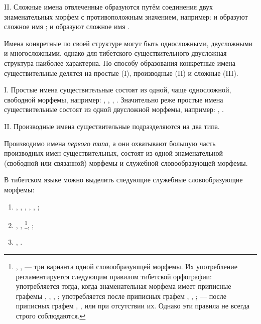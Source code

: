 II. Сложные имена отвлеченные образуются путём соединения двух знаменательных морфем с противоположным значением, например:  и  образуют сложное имя ;  и  образуют сложное имя .

Имена конкретные по своей структуре могут быть односложными, двусложными и многосложными, однако для тибетского существительного двусложная структура наиболее характерна. По способу образования конкретные имена существительные делятся на простые (I), производные (II) и сложные (III).

I. Простые имена существительные состоят из одной, чаще односложной, свободной морфемы, например: , , , . Значительно реже простые имена существительные состоят из одной двусложной морфемы, например: , .

II. Производные имена существительные подразделяются на два типа.

Производимо имена \emph{первого типа}, а они охватывают большую часть производных имен существительных, состоят из одной знаменательной (свободной или связанной) морфемы и служебной словообразующей морфемы.

В тибетском языке можно выделить следующие служебные словообразующие морфемы:

\begin{enumerate}
    \item {}, , , , , ;
    \item {}, , 
    \footnote[25]{, ,  --- три варианта одной словообразующей морфемы. Их употребление регламентируется следующим правилом тибетской орфографии:  употребляется тогда, когда знаменательная морфема имеет приписные графемы , , , ;  употребляется после приписных графем , , ;  --- после приписных графем , ,  или при отсутствии их. Однако эти правила не всегда строго соблюдаются.},
    ;
    \item {}, .
\end{enumerate}

